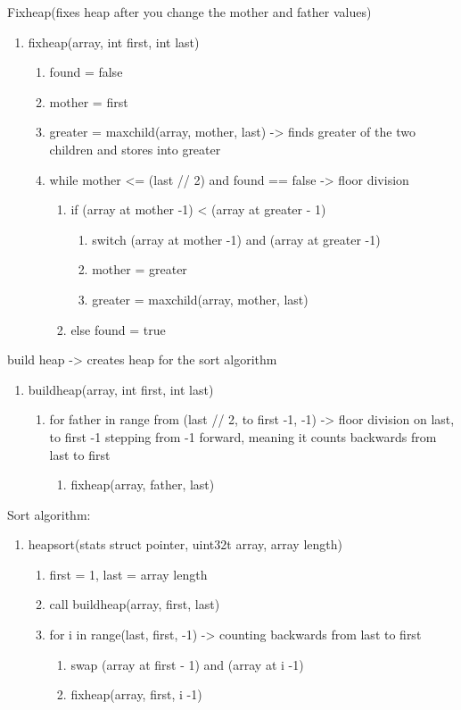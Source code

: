 \documentclass[11pt]{article}
\begin{document}
Fixheap(fixes heap after you change the mother and father values)
\begin{enumerate}
\item fixheap(array, int first, int last)
	\begin{enumerate}
	\item found = false
	\item mother = first
	\item greater = maxchild(array, mother, last) -> finds greater of the two children and stores into greater
	\item while mother <= (last // 2) and found == false -> floor division
		\begin{enumerate}
		\item if (array at mother -1) < (array at greater - 1)
			\begin{enumerate}
			\item switch (array at mother -1) and (array at greater -1)
			\item mother = greater
			\item greater = maxchild(array, mother, last)
			\end{enumerate}
		\item else found = true
		\end{enumerate}
	\end{enumerate}
\end{enumerate}

build heap -> creates heap for the sort algorithm
\begin{enumerate}
\item buildheap(array, int first, int last)
	\begin{enumerate}
	\item for father in range from (last // 2, to first -1, -1) -> floor division on last, to first -1 stepping from -1 forward, meaning it counts backwards from last to first
		\begin{enumerate}
		\item fixheap(array, father, last)
		\end{enumerate}
	\end{enumerate}
\end{enumerate}

Sort algorithm:
\begin{enumerate}
\item heapsort(stats struct pointer, uint32t array, array length)
	\begin{enumerate}
	\item first = 1, last = array length
	\item call buildheap(array, first, last)
	\item for i in range(last, first, -1) -> counting backwards from last to first
		\begin{enumerate}
		\item swap (array at first - 1) and (array at i -1)
		\item fixheap(array, first, i -1)
		\end{enumerate}
	\end{enumerate}
\end{enumerate}
\end{document}
